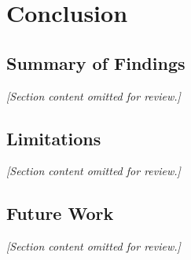 \chapter{Conclusion}
\label{ch:conclusion}

\section{Summary of Findings}
\textit{[Section content omitted for review.]}

\section{Limitations}
\textit{[Section content omitted for review.]}

\section{Future Work}
\textit{[Section content omitted for review.]}
